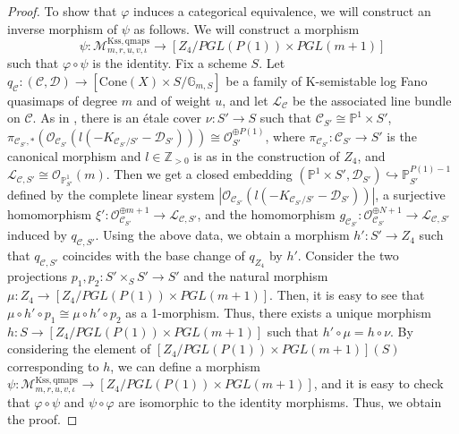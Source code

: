 \documentclass[12pt,twoside]{amsart}
\theoremstyle{definition}
\begin{document}
\begin{proof}
To show that $\varphi$ induces a categorical equivalence, we will construct an inverse morphism of $\psi$ as follows. 
We will construct a morphism
$$\psi \colon \mathcal{M}^{\mathrm{Kss,qmaps}}_{m,r,u,v,\iota} \to  [Z_4/PGL(P(1))\times PGL(m+1)]$$
such that $\varphi \circ \psi$ is the identity. 
Fix a scheme $S$. 
Let $q_{\mathcal{C}}\colon (\mathcal{C},\mathcal{D})\to [\mathrm{Cone}(X)\times S/\mathbb{G}_{m,S}]$ be a family of K-semistable log Fano quasimaps of degree $m$ and of weight $u$, and let $\mathscr{L}_{\mathcal{C}}$ be the associated line bundle on $\mathcal{C}$.
As in \cite[Proof of Theorem 4.2]{HH}, there is an \'{e}tale cover $\nu\colon S'\to S$ such that $\mathcal{C}_{S'}\cong \mathbb{P}^1\times S'$, $\pi_{\mathcal{C}_{S'},*}(\mathcal{O}_{\mathcal{C}_{S'}}(l(-K_{\mathcal{C}_{S'}/S'}-\mathcal{D}_{S'})))\cong\mathcal{O}_{S'}^{\oplus P(1)}$, where $\pi_{\mathcal{C}_{S'}}\colon \mathcal{C}_{S'}\to S'$ is the canonical morphism and $l \in \mathbb{Z}_{>0}$ is as in the construction of $Z_{4}$, and $\mathscr{L}_{\mathcal{C},S'}\cong \mathcal{O}_{\mathbb{P}^1_{S'}}(m)$. 
Then we get a closed embedding $(\mathbb{P}^1\times S',\mathcal{D}_{S'})\hookrightarrow\mathbb{P}^{P(1)-1}_{S'}$ defined by the complete linear system $|\mathcal{O}_{\mathcal{C}_{S'}}(l(-K_{\mathcal{C}_{S'}/S'}-\mathcal{D}_{S'}))|$, a surjective homomorphism $\xi'\colon\mathcal{O}_{\mathcal{C}_{S'}}^{\oplus m+1}\to \mathscr{L}_{\mathcal{C},S'}$, and the homomorphism $g_{\mathcal{C}_{S'}}\colon \mathcal{O}_{\mathcal{C}_{S'}}^{\oplus N+1}\to \mathscr{L}_{\mathcal{C},S'}$ induced by $q_{\mathcal{C},S'}$.
Using the above data, we obtain a morphism $h'\colon S'\to Z_4$ such that $q_{\mathcal{C},S'}$ coincides with the base change of $q_{Z_4}$ by $h'$.
Consider the two projections $p_1,p_2\colon S'\times_SS'\to S'$ and the natural morphism $\mu\colon Z_4\to [Z_4/PGL(P(1))\times PGL(m+1)]$.
Then, it is easy to see that $\mu\circ h'\circ p_1\cong\mu\circ h'\circ p_2$ as a 1-morphism.
Thus, there exists a unique morphism $h\colon S\to [Z_4/PGL(P(1))\times PGL(m+1)]$ such that $h' \circ \mu =h\circ \nu$. 
By considering the element of $[Z_4/PGL(P(1))\times PGL(m+1)](S)$ corresponding to $h$, we can define a morphism $\psi \colon \mathcal{M}^{\mathrm{Kss,qmaps}}_{m,r,u,v,\iota} \to [Z_4/PGL(P(1))\times PGL(m+1)]$, and it is easy to check that $\varphi \circ \psi$ and $\psi\circ\varphi$ are isomorphic to the identity morphisms. 
Thus, we obtain the proof.
\end{proof}
\end{document}
